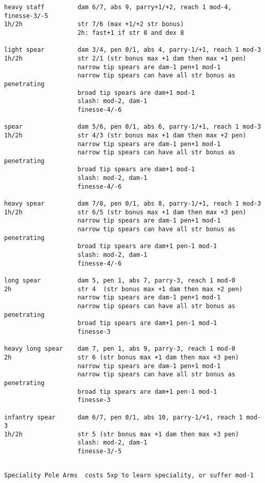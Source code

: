 \begin{verbatim}
heavy staff         dam 6/7, abs 9, parry+1/+2, reach 1 mod-4, finesse-3/-5
1h/2h               str 7/6 (max +1/+2 str bonus)
                    2h: fast+1 if str 8 and dex 8

light spear         dam 3/4, pen 0/1, abs 4, parry-1/+1, reach 1 mod-3
1h/2h               str 2/1 (str bonus max +1 dam then max +1 pen)
                    narrow tip spears are dam-1 pen+1 mod-1
                    narrow tip spears can have all str bonus as penetrating
                    broad tip spears are dam+1 mod-1
                    slash: mod-2, dam-1
                    finesse-4/-6

spear               dam 5/6, pen 0/1, abs 6, parry-1/+1, reach 1 mod-3
1h/2h               str 4/3 (str bonus max +1 dam then max +2 pen)
                    narrow tip spears are dam-1 pen+1 mod-1
                    narrow tip spears can have all str bonus as penetrating
                    broad tip spears are dam+1 mod-1
                    slash: mod-2, dam-1
                    finesse-4/-6

heavy spear         dam 7/8, pen 0/1, abs 8, parry-1/+1, reach 1 mod-3
1h/2h               str 6/5 (str bonus max +1 dam then max +3 pen)
                    narrow tip spears are dam-1 pen+1 mod-1
                    narrow tip spears can have all str bonus as penetrating
                    broad tip spears are dam+1 pen-1 mod-1
                    slash: mod-2, dam-1
                    finesse-4/-6

long spear          dam 5, pen 1, abs 7, parry-3, reach 1 mod-0
2h                  str 4  (str bonus max +1 dam then max +2 pen)
                    narrow tip spears are dam-1 pen+1 mod-1
                    narrow tip spears can have all str bonus as penetrating
                    broad tip spears are dam+1 pen-1 mod-1
                    finesse-3

heavy long spear    dam 7, pen 1, abs 9, parry-3, reach 1 mod-0
2h                  str 6 (str bonus max +1 dam then max +3 pen)
                    narrow tip spears are dam-1 pen+1 mod-1
                    narrow tip spears can have all str bonus as penetrating
                    broad tip spears are dam+1 pen-1 mod-1
                    finesse-3

infantry spear      dam 6/7, pen 0/1, abs 10, parry-1/+1, reach 1 mod-3
1h/2h               str 5 (str bonus max +1 dam then max +3 pen)
                    slash: mod-2, dam-1
                    finesse-3/-5


\end{verbatim} \pagebreak[1] \begin{verbatim}
Speciality Pole Arms  costs 5xp to learn speciality, or suffer mod-1


\end{verbatim}
